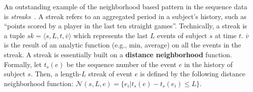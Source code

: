 An outstanding example of the neighborhood based pattern in the sequence data is \emph{streaks}~\cite{zhang2014discovering}. A streak refers to an aggregated period in a subject's history, such as ``points scored by a player in the last ten straight games''. 
Technically, a streak is a tuple $sk=\langle s, L, t, \overline{v} \rangle$
which represents the last $L$ events of subject $s$ at time $t$. $\overline{v}$
is the result of an analytic function (e.g., min, average)
on all the events in the streak. A streak is essentially 
built on  a \textbf{distance neighborhood} function. Formally,
let $t_s(e)$ be the sequence number of the event $e$ in the history of subject $s$.
Then, a length-$L$ streak of event $e$ is 
defined by the following distance neighborhood
function: $\mathcal{N}(s,L,e) = \{e_i | t_s(e) - t_s(e_i) \leq L \}$.
%

